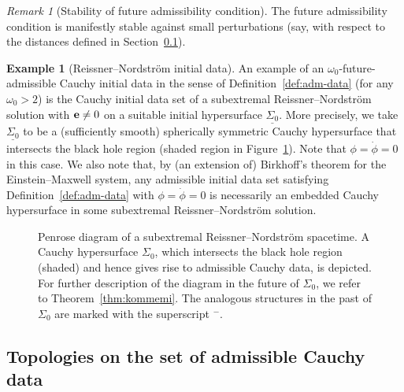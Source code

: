 \documentclass[10pt, reqno]{amsart}
\theoremstyle{definition}
\newtheorem{example}[theorem]{Example}
\theoremstyle{remark}
\newtheorem{remark}[theorem]{Remark}
\numberwithin{equation}{section}
\newcommand{\0}{\emptyset}
\newcommand{\Sgm}{\Sigma}
\newcommand{\omg}{\omega}
\newcommand{\bfe}{{\bf e}}
\newcommand{\e}{\bfe}							%
\begin{document}
\begin{remark}[Stability of future admissibility condition]\label{rmk:adm-stab}
The future admissibility condition is manifestly stable against small perturbations (say, with respect to the distances defined in Section~\ref{sec:topology}).
\end{remark}

\begin{example}[Reissner--Nordstr\"om initial data]\label{ex:RN}
An example of an $\omg_{0}$-future-admissible Cauchy initial data in the sense of Definition~\ref{def:adm-data} (for any $\omg_{0} > 2$) is the Cauchy initial data set of a subextremal Reissner--Nordstr\"om solution with $\e \neq 0$ on a suitable initial hypersurface $\underline{\Sgm_{0}}$. More precisely, we take $\underline{\Sgm_{0}}$ to be a (sufficiently smooth) spherically symmetric Cauchy hypersurface that intersects the black hole region (shaded region in Figure~\ref{fig:RNadm}). Note that $\phi = \dot{\phi} = 0$ in this case. We also note that, by (an extension of) Birkhoff's theorem for the Einstein--Maxwell system, any admissible initial data set satisfying Definition~\ref{def:adm-data} with $\phi = \dot{\phi} = 0$ is necessarily an embedded Cauchy hypersurface in some subextremal Reissner--Nordstr\"om solution.
\end{example}

\begin{figure}[h]
\begin{center}
\def\svgwidth{160px}
{\small  }
\caption{Penrose diagram of a subextremal Reissner--Nordstr\"om spacetime. A Cauchy hypersurface $\Sigma_0$, which intersects the black hole region (shaded) and hence gives rise to admissible Cauchy data, is depicted. For further description of the diagram in the future of $\Sgm_{0}$, we refer to Theorem~\ref{thm:kommemi}. The analogous structures in the past of $\Sgm_{0}$ are marked with the superscript ${}^{-}$. } \label{fig:RNadm} 
\end{center}
\end{figure}

\subsection{Topologies on the set of admissible Cauchy data}\label{sec:topology}
\end{document}

